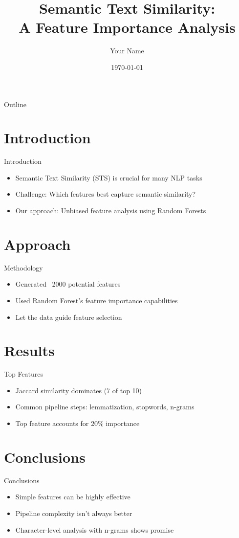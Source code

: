 \documentclass{beamer}
\title{Semantic Text Similarity:\\A Feature Importance Analysis}
\author{Your Name}
\institute{Universitat Politècnica de Catalunya}
\date{\today}
\begin{document}
\begin{frame}
    \titlepage
\end{frame}

\begin{frame}{Outline}
    \tableofcontents
\end{frame}

\section{Introduction}
\begin{frame}{Introduction}
    \begin{itemize}
        \item Semantic Text Similarity (STS) is crucial for many NLP tasks
        \item Challenge: Which features best capture semantic similarity?
        \item Our approach: Unbiased feature analysis using Random Forests
    \end{itemize}
\end{frame}

\section{Approach}
\begin{frame}{Methodology}
    \begin{itemize}
        \item Generated ~2000 potential features
        \item Used Random Forest's feature importance capabilities
        \item Let the data guide feature selection
    \end{itemize}
\end{frame}

\section{Results}
\begin{frame}{Top Features}
    \begin{itemize}
        \item Jaccard similarity dominates (7 of top 10)
        \item Common pipeline steps: lemmatization, stopwords, n-grams
        \item Top feature accounts for 20\% importance
    \end{itemize}
\end{frame}

\section{Conclusions}
\begin{frame}{Conclusions}
    \begin{itemize}
        \item Simple features can be highly effective
        \item Pipeline complexity isn't always better
        \item Character-level analysis with n-grams shows promise
    \end{itemize}
\end{frame}
\end{document}
